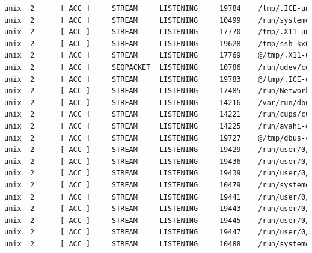 \documentclass[10pt,a4paper]{article}
\begin{document}
\begin{enumerate}[label=\textbf{\alph*)}]
\begin{lstlisting}[language=bash]
unix  2      [ ACC ]     STREAM     LISTENING     19784    /tmp/.ICE-unix/721
unix  2      [ ACC ]     STREAM     LISTENING     10499    /run/systemd/journal/stdout
unix  2      [ ACC ]     STREAM     LISTENING     17770    /tmp/.X11-unix/X0
unix  2      [ ACC ]     STREAM     LISTENING     19628    /tmp/ssh-kx6ERuyTOjOS/agent.680
unix  2      [ ACC ]     STREAM     LISTENING     17769    @/tmp/.X11-unix/X0
unix  2      [ ACC ]     SEQPACKET  LISTENING     10786    /run/udev/control
unix  2      [ ACC ]     STREAM     LISTENING     19783    @/tmp/.ICE-unix/721
unix  2      [ ACC ]     STREAM     LISTENING     17485    /run/NetworkManager/private-dhcp
unix  2      [ ACC ]     STREAM     LISTENING     14216    /var/run/dbus/system_bus_socket
unix  2      [ ACC ]     STREAM     LISTENING     14221    /run/cups/cups.sock
unix  2      [ ACC ]     STREAM     LISTENING     14225    /run/avahi-daemon/socket
unix  2      [ ACC ]     STREAM     LISTENING     19727    @/tmp/dbus-cLiJoZjMM2
unix  2      [ ACC ]     STREAM     LISTENING     19429    /run/user/0/systemd/private
unix  2      [ ACC ]     STREAM     LISTENING     19436    /run/user/0/gnupg/S.gpg-agent.browser
unix  2      [ ACC ]     STREAM     LISTENING     19439    /run/user/0/gnupg/S.dirmngr
unix  2      [ ACC ]     STREAM     LISTENING     10479    /run/systemd/private
unix  2      [ ACC ]     STREAM     LISTENING     19441    /run/user/0/gnupg/S.gpg-agent.ssh
unix  2      [ ACC ]     STREAM     LISTENING     19443    /run/user/0/gnupg/S.gpg-agent.extra
unix  2      [ ACC ]     STREAM     LISTENING     19445    /run/user/0/gnupg/S.gpg-agent
unix  2      [ ACC ]     STREAM     LISTENING     19447    /run/user/0/bus
unix  2      [ ACC ]     STREAM     LISTENING     10488    /run/systemd/fsck.progress
\end{lstlisting}


\end{enumerate}
\end{document}
